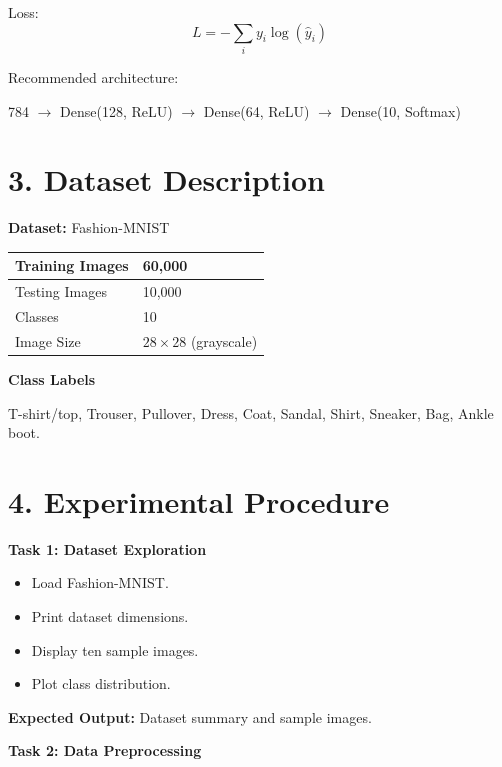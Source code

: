 \documentclass[11pt]{article}
\begin{document}
Loss:
\[
L=-\sum_i y_i\log(\hat y_i)
\]

Recommended architecture:

\begin{center}
784 $\rightarrow$ Dense(128, ReLU) $\rightarrow$ Dense(64, ReLU) $\rightarrow$ Dense(10, Softmax)
\end{center}


\section*{3. Dataset Description}

\textbf{Dataset:} Fashion-MNIST

\begin{center}
\begin{tabular}{|l|l|}
\hline
Training Images & 60,000\\
\hline
Testing Images & 10,000\\
\hline
Classes & 10\\
\hline
Image Size & $28 \times 28$ (grayscale)\\
\hline
\end{tabular}
\end{center}

\textbf{Class Labels}

T-shirt/top, Trouser, Pullover, Dress, Coat, Sandal, Shirt, Sneaker, Bag, Ankle boot.




\section*{4. Experimental Procedure}

\textbf{Task 1: Dataset Exploration}
\begin{itemize}
\item Load Fashion-MNIST.
\item Print dataset dimensions.
\item Display ten sample images.
\item Plot class distribution.
\end{itemize}

\textbf{Expected Output:}
Dataset summary and sample images.

\bigskip

\textbf{Task 2: Data Preprocessing}
\end{document}
